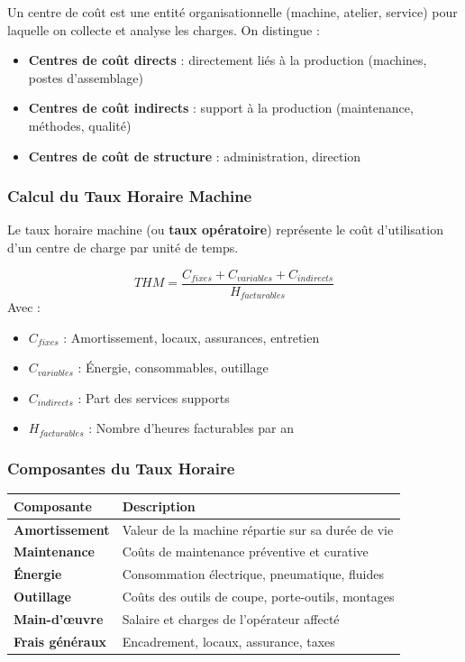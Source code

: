 \documentclass{article}
\begin{document}
Un centre de coût est une entité organisationnelle (machine, atelier, service) pour laquelle on collecte et analyse les charges. On distingue :

\begin{itemize}
    \item \textbf{Centres de coût directs} : directement liés à la production (machines, postes d'assemblage)
    \item \textbf{Centres de coût indirects} : support à la production (maintenance, méthodes, qualité)
    \item \textbf{Centres de coût de structure} : administration, direction
\end{itemize}

\subsubsection{Calcul du Taux Horaire Machine}

Le taux horaire machine (ou \textbf{taux opératoire}) représente le coût d'utilisation d'un centre de charge par unité de temps.

\begin{tcolorbox}[colback=green!5!white, colframe=green!50!black, title=Formule de calcul du taux horaire]
\[
THM = \frac{C_{fixes} + C_{variables} + C_{indirects}}{H_{facturables}}
\]
\vspace{0.5em}
Avec :
\begin{itemize}
    \item $C_{fixes}$ : Amortissement, locaux, assurances, entretien
    \item $C_{variables}$ : Énergie, consommables, outillage
    \item $C_{indirects}$ : Part des services supports
    \item $H_{facturables}$ : Nombre d'heures facturables par an
\end{itemize}
\end{tcolorbox}

\subsubsection{Composantes du Taux Horaire}

\begin{tabular}{|p{}|p{}|}
\hline
\textbf{Composante} & \textbf{Description} \\
\hline
\textbf{Amortissement} & Valeur de la machine répartie sur sa durée de vie \\
\hline
\textbf{Maintenance} & Coûts de maintenance préventive et curative \\
\hline
\textbf{Énergie} & Consommation électrique, pneumatique, fluides \\
\hline
\textbf{Outillage} & Coûts des outils de coupe, porte-outils, montages \\
\hline
\textbf{Main-d'œuvre} & Salaire et charges de l'opérateur affecté \\
\hline
\textbf{Frais généraux} & Encadrement, locaux, assurance, taxes \\
\hline
\end{tabular}
\end{document}
